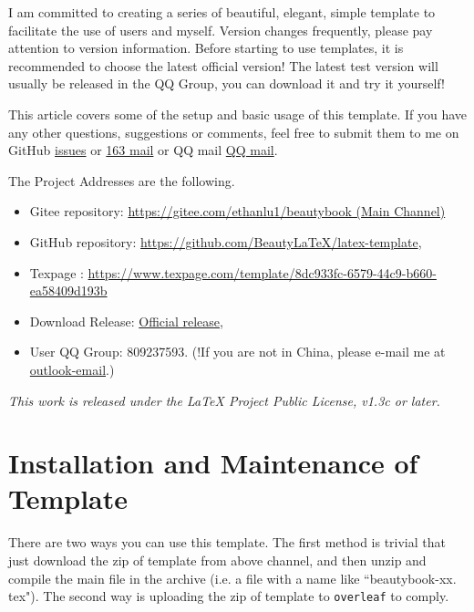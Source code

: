 \documentclass[lang=en,12pt]{beautybook}
\begin{document}
I am committed to creating a series of beautiful, elegant, simple template to facilitate the use of users and myself. Version changes frequently, please pay attention to version information. Before starting to use templates, it is recommended to choose the latest official version! The latest test version will usually be released in the QQ Group, you can download it and try it yourself!


This article covers some of the setup and basic usage of this template. If you have any other questions, suggestions or comments, feel free to submit them to me on GitHub
\href{https://github.com/BeautyLaTeX/latex-template/issues}{issues} or \href{h1479840692@163.com}{163 mail} or QQ mail \href{1479840692@qq.com}{QQ mail}. 


The Project Addresses are the following.
\begin{itemize}
    \item Gitee repository: \href{https://gitee.com/ethanlu1/beautybook}{https://gitee.com/ethanlu1/beautybook (Main Channel)}
    \item GitHub repository: \href{https://github.com/BeautyLaTeX/latex-template}{https://github.com/BeautyLaTeX/latex-template},
    \item Texpage : \href{https://www.texpage.com/template/8dc933fc-6579-44c9-b660-ea58409d193b}{https://www.texpage.com/template/8dc933fc-6579-44c9-b660-ea58409d193b}
    \item Download Release: \href{https://github.com/BeautyLaTeX/latex-template/releases}{Official release},
    \item User QQ Group: 809237593. (!If you are not in China, please e-mail me at \href{h1479840692@outlook.com}{outlook-email}.)
\end{itemize}

\textit{This work is released under the LaTeX Project Public License, v1.3c or later.}

\section{Installation and Maintenance of Template}

There are two ways you can use this template. The first method is trivial that just download the zip of template from above channel, and then unzip and compile the main file in the archive (i.e. a file with a name like ``beautybook-xx. tex"). The second way is uploading the zip of template to \texttt{overleaf} to comply.
\end{document}

